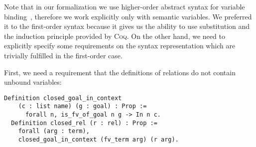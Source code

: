 Note that in our formalization we use higher-order abstract syntax for variable binding~\cite{HOAS}, therefore we work explicitly only with semantic variables.
We preferred it to the first-order syntax because it gives us the ability to use substitution and the induction principle provided by \textsc{Coq}.
On the other hand, we need to explicitly specify some requirements on the syntax representation which are trivially fulfilled in the first-order case.

First, we need a requirement that the definitions of relations do not contain unbound variables:

\begin{lstlisting}[language=Coq] 
  Definition closed_goal_in_context 
    (c : list name) (g : goal) : Prop :=
      forall n, is_fv_of_goal n g -> In n c.
  Definition closed_rel (r : rel) : Prop :=
    forall (arg : term),
    closed_goal_in_context (fv_term arg) (r arg).
\end{lstlisting}

